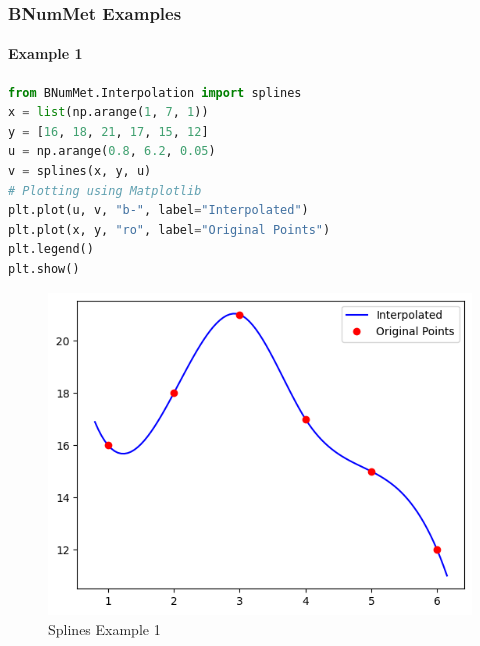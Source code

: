 \subsubsection{BNumMet Examples}
\paragraph{Example 1}{
\begin{lstlisting}[language=Python]
from BNumMet.Interpolation import splines
x = list(np.arange(1, 7, 1))
y = [16, 18, 21, 17, 15, 12]
u = np.arange(0.8, 6.2, 0.05)
v = splines(x, y, u)
# Plotting using Matplotlib
plt.plot(u, v, "b-", label="Interpolated")
plt.plot(x, y, "ro", label="Original Points")
plt.legend()
plt.show()
\end{lstlisting}
\begin{figure}[H]
    \centering
    \includegraphics{Include/Images/Thesis/Documentation/Interpolation/Splines Example 1.png}
    \caption{Splines Example 1}
    \label{fig:Splines Example 1}
\end{figure}

}
